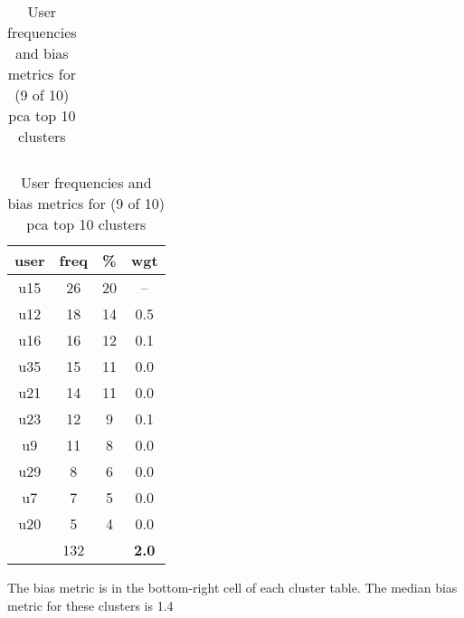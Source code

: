 \begin{table}
\begin{tabular}{ |c|c|c|c| }
	\hline
\end{tabular}
\begin{tabular}{ |c|c|c|c| }
	\hline
	\textbf{user} & \textbf{freq} & \textbf{\%} & \textbf{wgt} \\
	\hline
	u15 & 26 & 20 & -- \\
	u12 & 18 & 14 & 0.5 \\
	u16 & 16 & 12 & 0.1 \\
	u35 & 15 & 11 & 0.0 \\
	u21 & 14 & 11 & 0.0 \\
	u23 & 12 & 9 & 0.1 \\
	u9 & 11 & 8 & 0.0 \\
	u29 & 8 & 6 & 0.0 \\
	u7 & 7 & 5 & 0.0 \\
	u20 & 5 & 4 & 0.0 \\
	 & 132 & & \textbf{2.0} \\
	\hline
\end{tabular}
\caption{User frequencies and bias metrics for (9 of 10) pca top 10 clusters}
{\small The bias metric is in the bottom-right cell of each cluster table. The median bias metric for these clusters is 1.4}
\end{table}


